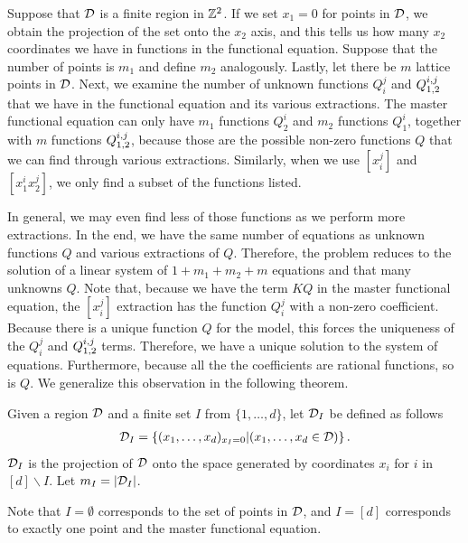 \begin{exa}Suppose that $\mathcal{D}$ is a finite region in $\mathbb{Z}^2$. If we set $x_1 = 0$ for points in $\mathcal{D}$, we obtain the projection of the set onto the $x_2$ axis, and this tells us how many $x_2$ coordinates we have in functions in the functional equation. Suppose that the number of points is $m_1$ and define $m_2$ analogously. Lastly, let there be $m$ lattice points in $\mathcal{D}$. Next, we examine the number of unknown functions $Q_i^j$ and $Q_{1,2}^{i,j}$ that we have in the functional equation and its various extractions. The master functional equation can only have $m_1$ functions $Q_2^i$ and $m_2$ functions $Q_1^i$, together with $m$ functions $Q_{1,2}^{i,j}$, because those are the possible non-zero functions $Q$ that we can find through various extractions. Similarly, when we use $[x_i^j]$ and $[x_1^i x_2^j]$, we only find a subset of the functions listed. 

In general, we may even find less of those functions as we perform more extractions. In the end, we have the same number of equations as unknown functions $Q$ and various extractions of $Q$. Therefore, the problem reduces to the solution of a linear system of $1 + m_1 + m_2 + m$ equations and that many unknowns $Q$. Note that, because we have the term $KQ$ in the master functional equation, the $[x_i^j]$ extraction has the function $Q_i^j$ with a non-zero coefficient. Because there is a unique function $Q$ for the model, this forces the uniqueness of the $Q_i^j$ and $Q_{1,2}^{i,j}$ terms. Therefore, we have a unique solution to the system of equations. Furthermore, because all the the coefficients are rational functions, so is $Q$. We generalize this observation in the following theorem.
\end{exa}

\begin{defn} Given a \dD region $\mathcal{D}$ and a finite set $I$ from $\{1,\ldots, d\}$, let $\mathcal{D}_I$ be defined as follows
\begin{align}
	\mathcal{D}_I = \{(x_1,\ldots, x_d)_{x_I = 0} | (x_1,\ldots, x_d \in \mathcal{D})\}\,.
\end{align}
 $\mathcal{D}_I$ is the projection of $\mathcal{D}$ onto the space generated by coordinates $x_i$ for $i$ in $[d]\backslash I$. Let $m_I = |\mathcal{D}_I|$.
\end{defn}

Note that $I = \emptyset$ corresponds to the set of points in $\mathcal{D}$, and $I = [d]$ corresponds to exactly one point and the master functional equation.

